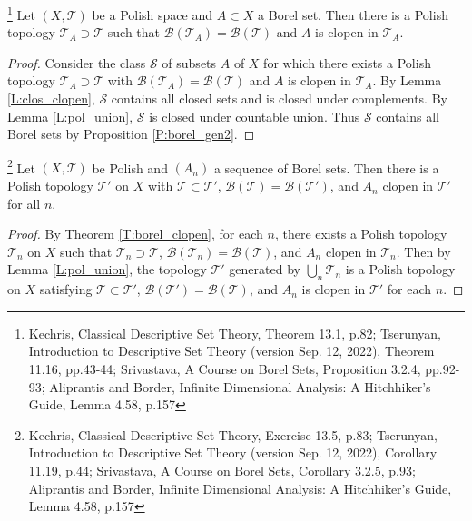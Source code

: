 \begin{theorem} \label{T:borel_clopen}
\footnote{
  Kechris, Classical Descriptive Set Theory, Theorem 13.1, p.82;
  Tserunyan, Introduction to Descriptive Set Theory (version Sep. 12,
  2022), Theorem 11.16, pp.43-44; 
  Srivastava, A Course on Borel Sets, Proposition 3.2.4, pp.92-93; 
  Aliprantis and Border, Infinite Dimensional Analysis: A Hitchhiker's 
  Guide, Lemma 4.58, p.157}
Let $(X,\mathcal{T})$ be a Polish space and $A\subset X$ a Borel set. Then
there is a Polish topology $\mathcal{T}_A\supset \mathcal{T}$ such that
$\mathcal{B}(\mathcal{T}_A)=\mathcal{B}(\mathcal{T})$ and $A$ is clopen in
$\mathcal{T}_A$.
\end{theorem}
\begin{proof}
Consider the class $\mathcal{S}$ of subsets $A$ of $X$ for which there exists
a Polish topology $\mathcal{T}_A \supset \mathcal{T}$ with 
$\mathcal{B}(\mathcal{T}_A)=\mathcal{B}(\mathcal{T})$ and $A$ is clopen in
$\mathcal{T}_A$. By Lemma \ref{L:clos_clopen}, $\mathcal{S}$ contains all 
closed sets and is closed under complements. By Lemma \ref{L:pol_union},
$\mathcal{S}$ is closed under countable union. 
Thus $\mathcal{S}$ contains all Borel sets by Proposition \ref{P:borel_gen2}.
\end{proof}

\begin{corollary} \label{C:borel_clopen2}
\footnote{
  Kechris, Classical Descriptive Set Theory, Exercise 13.5, p.83;
  Tserunyan, Introduction to Descriptive Set Theory (version Sep. 12,
  2022), Corollary 11.19, p.44; 
  Srivastava, A Course on Borel Sets, Corollary 3.2.5, p.93; 
  Aliprantis and Border, Infinite Dimensional Analysis: A Hitchhiker's 
  Guide, Lemma 4.58, p.157}
Let $(X,\mathcal{T})$ be Polish and $(A_n)$ a sequence of Borel sets.
Then there is a Polish topology $\mathcal{T}'$ on $X$ with 
$\mathcal{T}\subset\mathcal{T}'$, 
$\mathcal{B}(\mathcal{T})=\mathcal{B}(\mathcal{T}')$, and $A_n$ clopen
in $\mathcal{T}'$ for all $n$.
\end{corollary}
\begin{proof}
By Theorem \ref{T:borel_clopen}, for each $n$, there exists a Polish topology
$\mathcal{T}_n$ on $X$ such that $\mathcal{T}_n\supset\mathcal{T}$,
$\mathcal{B}(\mathcal{T}_n)=\mathcal{B}(\mathcal{T})$, and $A_n$ clopen
in $\mathcal{T}_n$. Then by Lemma \ref{L:pol_union}, the topology 
$\mathcal{T}'$ generated by $\bigcup_n \mathcal{T}_n$ is a Polish topology
on $X$ satisfying $\mathcal{T}\subset\mathcal{T}'$,
$\mathcal{B}(\mathcal{T}')=\mathcal{B}(\mathcal{T})$, and $A_n$ is clopen
in $\mathcal{T}'$ for each $n$.
\end{proof}

